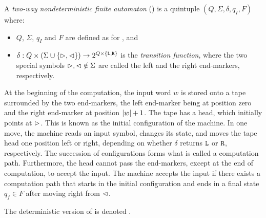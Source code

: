 \begin{defn}
	A \emph{two-way nondeterministic finite automaton} (\TNFA) is a quintuple $(Q,\Sigma,\delta,q_I,F)$ where:
	\begin{itemize}
		\item $Q$, $\Sigma$, $q_I$ and $F$ are defined as for \ONFAs, and
		\item $\delta:Q\times(\Sigma\cup\{\rhd,\lhd\})\to2^{Q\times\{\mathtt L,\mathtt R\}}$ is the \emph{transition function}, where the two special symbols $\rhd,\lhd\notin\Sigma$ are called the left and the right end-markers, respectively.
	\end{itemize}
	At the beginning of the computation, the input word $w$ is stored onto a tape surrounded by the two end-markers, the left end-marker being at position zero and the right end-marker at position $\lvert w \rvert+1$.
	The tape has a head, which initially points at $\rhd$.
	This is known as the initial configuration of the machine.
	In one move, the machine reads an input symbol, changes its state, and moves the tape head one position left or right, depending on whether $\delta$ returns $\mathtt L$ or $\mathtt R$, respectively.
	The succession of configurations forms what is called a computation path.
	Furthermore, the head cannot pass the end-markers, except at the end of computation, to accept the input.
	The machine accepts the input if there exists a computation path that starts in the initial configuration and ends in a final state $q_f\in F$ after moving right from $\lhd$.

	The deterministic version of \TNFA is denoted \TDFA.
\end{defn}


